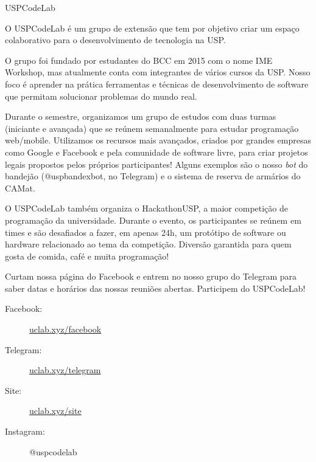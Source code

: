 \begin{subsecao}{USPCodeLab}


O USPCodeLab é um grupo de extensão que tem por objetivo criar um espaço
colaborativo para o desenvolvimento de tecnologia na USP.

O grupo foi fundado por estudantes do BCC em 2015 com o nome IME Workshop, mas
atualmente conta com integrantes de vários cursos da USP. Nosso foco é aprender
na prática ferramentas e técnicas de desenvolvimento de software que permitam
solucionar problemas do mundo real.

Durante o semestre, organizamos um grupo de estudos com duas turmas (iniciante
e avançada) que se reúnem semanalmente para estudar programação web/mobile.
Utilizamos os recursos mais avançados, criados por grandes empresas como Google
e Facebook e pela comunidade de software livre, para criar projetos legais
propostos pelos próprios participantes! Alguns exemplos são o nosso \textit{bot}
do bandejão (@uspbandexbot, no Telegram) e o sistema de reserva de armários do
CAMat.

O USPCodeLab também organiza o HackathonUSP, a maior competição de programação
da universidade. Durante o evento, os participantes se reúnem em times e são
desafiados a fazer, em apenas 24h, um protótipo de software ou hardware
relacionado ao tema da competição. Diversão garantida para quem gosta de comida,
café e muita programação!

Curtam nossa página do Facebook e entrem no nosso grupo do Telegram para saber
datas e horários das nossas reuniões abertas. Participem do USPCodeLab!

\begin{description}
\item[Facebook:] \url{uclab.xyz/facebook}
\item[Telegram:] \url{uclab.xyz/telegram}
\item[Site:] \url{uclab.xyz/site}
\item[Instagram:] @uspcodelab
\end{description}

\end{subsecao}
